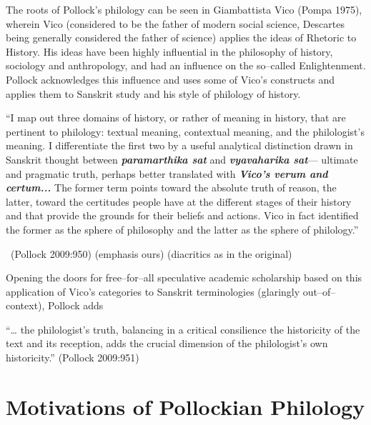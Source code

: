The roots of Pollock’s philology can be seen in Giambattista Vico (Pompa 1975), wherein Vico (considered to be the father of modern social science, Descartes being generally considered the father of science) applies the ideas of Rhetoric to History. His ideas have been highly influential in the philosophy of history, sociology and anthropology, and had an influence on the so–called Enlightenment. Pollock acknowledges this influence and uses some of Vico’s constructs and applies them to Sanskrit study and his style of philology of history.

\begin{myquote}
“I map out three domains of history, or rather of meaning in history, that are pertinent to philology: textual meaning, contextual meaning, and the philologist’s meaning. I differentiate the first two by a useful analytical distinction drawn in Sanskrit thought between \textbf{\textit{paramarthika sat}} and \textbf{\textit{vyavaharika sat}}— ultimate and pragmatic truth, perhaps better translated with \textbf{\textit{Vico’s verum and certum...}} The former term points toward the absolute truth of reason, the latter, toward the certitudes people have at the different stages of their history and that provide the grounds for their beliefs and actions. Vico in fact identified the former as the sphere of philosophy and the latter as the sphere of philology.”

~\hfill (Pollock 2009:950) (emphasis ours) (diacritics as in the original)
\end{myquote}

Opening the doors for free–for–all speculative academic scholarship based on this application of Vico’s categories to Sanskrit terminologies (glaringly out–of–context), Pollock adds

\begin{myquote}
“… the philologist’s truth, balancing in a critical consilience the historicity of the text and its reception, adds the crucial dimension of the philologist’s own historicity.” (Pollock 2009:951)
\end{myquote}


\section*{Motivations of Pollockian Philology}

